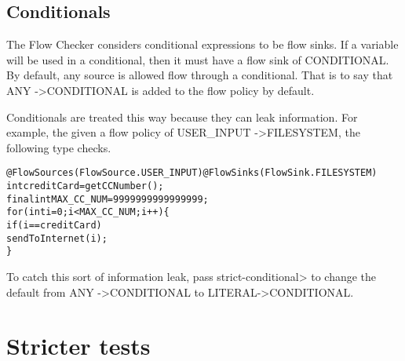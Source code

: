 \subsection{Conditionals}

The Flow Checker considers conditional expressions to be flow sinks.  If a variable 
will be used in a conditional, then it must have a flow sink of CONDITIONAL.  By default, 
any source is allowed flow through a conditional.  That is to say that 
ANY -\textgreater CONDITIONAL is added to the flow policy by default. 

Conditionals are treated this way because they can leak information. For example, the given a flow policy of  USER\_INPUT -\textgreater FILESYSTEM, the following type checks.

\begin{alltt}
@FlowSources(FlowSource.USER_INPUT)@FlowSinks(FlowSink.FILESYSTEM)
int creditCard = getCCNumber();
final int MAX\_CC\_NUM=9999999999999999;
for (int i = 0 ; i < MAX\_CC\_NUM ; i++)\{
   if ( i == creditCard )
        sendToInternet(i);
\}
\end{alltt}

To catch this sort of information leak, pass
 \<strict-conditional> to change the default from ANY -\textgreater CONDITIONAL to 
 LITERAL-\textgreater CONDITIONAL. 


%
%
%




\section{Stricter tests}


